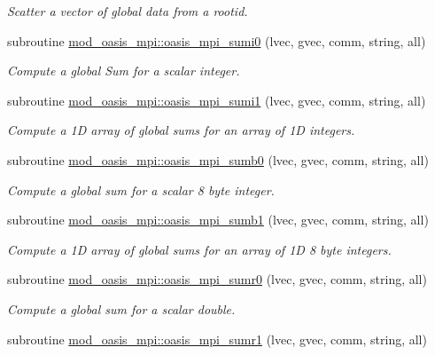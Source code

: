 \begin{DoxyCompactItemize}
\begin{DoxyCompactList}\small\item\em Scatter a vector of global data from a rootid. \end{DoxyCompactList}\item 
subroutine \hyperlink{namespacemod__oasis__mpi_adbb3963310e45ac012e5e28f13d5781e}{mod\+\_\+oasis\+\_\+mpi\+::oasis\+\_\+mpi\+\_\+sumi0} (lvec, gvec, comm, string, all)
\begin{DoxyCompactList}\small\item\em Compute a global Sum for a scalar integer. \end{DoxyCompactList}\item 
subroutine \hyperlink{namespacemod__oasis__mpi_a507bb5e0ae088d68bb68c566e8965bef}{mod\+\_\+oasis\+\_\+mpi\+::oasis\+\_\+mpi\+\_\+sumi1} (lvec, gvec, comm, string, all)
\begin{DoxyCompactList}\small\item\em Compute a 1D array of global sums for an array of 1D integers. \end{DoxyCompactList}\item 
subroutine \hyperlink{namespacemod__oasis__mpi_ae4d2818f21f445e594aad97598f49d8e}{mod\+\_\+oasis\+\_\+mpi\+::oasis\+\_\+mpi\+\_\+sumb0} (lvec, gvec, comm, string, all)
\begin{DoxyCompactList}\small\item\em Compute a global sum for a scalar 8 byte integer. \end{DoxyCompactList}\item 
subroutine \hyperlink{namespacemod__oasis__mpi_a3f32594b15b9ae3629969839ab952012}{mod\+\_\+oasis\+\_\+mpi\+::oasis\+\_\+mpi\+\_\+sumb1} (lvec, gvec, comm, string, all)
\begin{DoxyCompactList}\small\item\em Compute a 1D array of global sums for an array of 1D 8 byte integers. \end{DoxyCompactList}\item 
subroutine \hyperlink{namespacemod__oasis__mpi_a02b0555479a3d54e1c3d42219af9b991}{mod\+\_\+oasis\+\_\+mpi\+::oasis\+\_\+mpi\+\_\+sumr0} (lvec, gvec, comm, string, all)
\begin{DoxyCompactList}\small\item\em Compute a global sum for a scalar double. \end{DoxyCompactList}\item 
subroutine \hyperlink{namespacemod__oasis__mpi_aac62148bc912b158aff769572f27b8d3}{mod\+\_\+oasis\+\_\+mpi\+::oasis\+\_\+mpi\+\_\+sumr1} (lvec, gvec, comm, string, all)

\end{DoxyCompactItemize}

